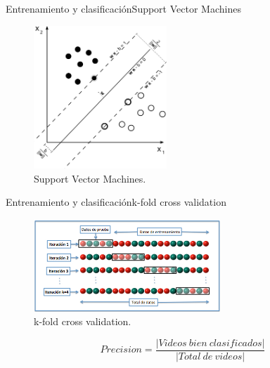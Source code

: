 \documentclass{beamer}
\begin{document}
        \begin{frame}{Entrenamiento y clasificación}{Support Vector Machines}
            \begin{figure}[bt]
        		\centering
                \includegraphics[width=5cm]{imagenes/support_vector_machines.png}
          		\caption{Support Vector Machines.}
            \end{figure}
        \end{frame}
        
        \begin{frame}{Entrenamiento y clasificación}{k-fold cross validation}
            \begin{figure}[bt]
        		\centering
                \includegraphics[width=7cm]{imagenes/K-fold.jpg}
          		\caption{k-fold cross validation.}
            \end{figure}
            \begin{equation}
            		Precision = \frac{|Videos~bien~clasificados|}{|Total~de~videos|} 
            \end{equation}
   
        \end{frame}
        
			        
        
\end{document}
